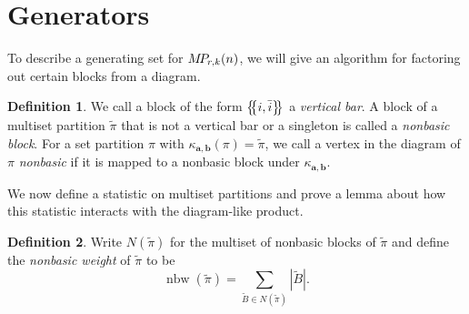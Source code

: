 \documentclass[10pt]{amsart}
\theoremstyle{definition}
\newtheorem{defi}[defi]{Definition}
\theoremstyle{definition}
\theoremstyle{plain}
\theoremstyle{remark}
\theoremstyle{plain}
\theoremstyle{plain}
\newcommand{\bfa}{{\boldsymbol{a}}}
\newcommand{\bfb}{{\boldsymbol{b}}}
\newcommand{\MP}{{\rm M\!P\!}}
\newcommand{\tpi}{{\tilde{\pi}}}
\newcommand{\tB}{{\tilde{B}}}
\newcommand{\multi}[1]{\left\{\mskip-5mu\left\{#1\right\}\mskip-5mu\right\}}
\newcommand{\ov}[1]{\bar{#1}}
\newcommand{\abs}[1]{\left| #1\right |}
\newcommand{\defn}[1]{\textcolor{defncolor}{\emph{#1}}}
\DeclareMathOperator{\nbw}{nbw}
\begin{document}
\section{Generators}\label{sec:generators}

To describe a generating set for $\MP_{r,k}(n)$, we will give an algorithm for factoring out certain blocks from a diagram. 

\begin{defi}
    We call a block of the form $\multi{i,\ov i}$ a \defn{vertical bar}. A block of a multiset partition $\tpi$ that is not a vertical bar or a singleton is called a \defn{nonbasic block}. For a set partition $\pi$ with $\kappa_{\bfa,\bfb}(\pi)=\tpi$, we call a vertex in the diagram of $\pi$ \defn{nonbasic} if it is mapped to a nonbasic block under $\kappa_{\bfa,\bfb}$.
\end{defi}

We now define a statistic on multiset partitions and prove a lemma about how this statistic interacts with the diagram-like product.

\begin{defi}
    Write $N(\tpi)$ for the multiset of nonbasic blocks of $\tpi$ and define the \defn{nonbasic weight} of $\tpi$ to be \[\nbw(\tpi)=\sum_{\tB\in N(\tpi)}\abs{\tB}.\]
\end{defi}
\end{document}
